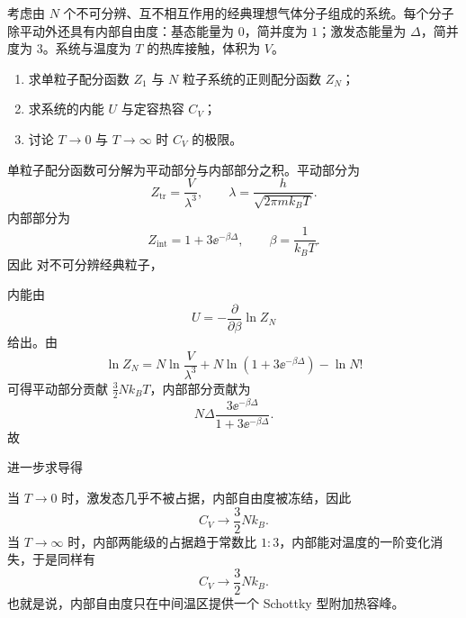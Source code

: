 ﻿

\begin{question}
考虑由 $N$ 个不可分辨、互不相互作用的经典理想气体分子组成的系统。每个分子除平动外还具有内部自由度：基态能量为 $0$，简并度为 $1$；激发态能量为 $\Delta$，简并度为 $3$。系统与温度为 $T$ 的热库接触，体积为 $V$。

\begin{enumerate}[label=(\arabic*),leftmargin=2.5em]
  \item 求单粒子配分函数 $Z_1$ 与 $N$ 粒子系统的正则配分函数 $Z_N$；
  \item 求系统的内能 $U$ 与定容热容 $C_V$；
  \item 讨论 $T\to 0$ 与 $T\to \infty$ 时 $C_V$ 的极限。
\end{enumerate}

\begin{solution}
单粒子配分函数可分解为平动部分与内部部分之积。平动部分为
\[
Z_{\mathrm{tr}}=\frac{V}{\lambda^3},
\qquad
\lambda=\frac{h}{\sqrt{2\pi m k_B T}}.
\]
内部部分为
\[
Z_{\mathrm{int}}=1+3\ee^{-\beta\Delta},
\qquad \beta=\frac{1}{k_B T}.
\]
因此
对不可分辨经典粒子，

内能由
\[
U=-\frac{\partial}{\partial\beta}\ln Z_N
\]
给出。由
\[
\ln Z_N=N\ln\frac{V}{\lambda^3}+N\ln(1+3\ee^{-\beta\Delta})-\ln N!
\]
可得平动部分贡献 $\tfrac32 Nk_B T$，内部部分贡献为
\[
N\Delta\frac{3\ee^{-\beta\Delta}}{1+3\ee^{-\beta\Delta}}.
\]
故

进一步求导得

当 $T\to 0$ 时，激发态几乎不被占据，内部自由度被冻结，因此
\[
C_V\to \frac32 Nk_B.
\]
当 $T\to \infty$ 时，内部两能级的占据趋于常数比 $1:3$，内部能对温度的一阶变化消失，于是同样有
\[
C_V\to \frac32 Nk_B.
\]
也就是说，内部自由度只在中间温区提供一个 Schottky 型附加热容峰。
\end{solution}
\end{question}

